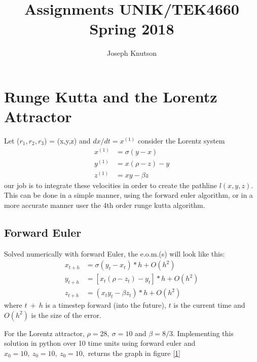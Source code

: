 \documentclass[a4paper,10pt]{article}
\title{Assignments UNIK/TEK4660 Spring 2018}
\author{Joseph Knutson}
\begin{document}
\maketitle

\section*{Runge Kutta and the Lorentz Attractor}

Let ($r_1,r_2,r_3$) = (x,y,z) and $dx/dt = x^{(1)}$ consider the Lorentz system
\begin{align}
 x^{(1)} &= \sigma(y - x) \label{x} \\ 
 y^{(1)} &= x(\rho - z) - y   \label{y}\\
 z^{(1)} &= xy - \beta z  \label{z}
\end{align}
our job is to integrate these velocities in order to create the pathline $l(x,y,z)$.
This can be done in a simple manner, using the forward euler algorithm, or in a more accurate manner user the 4th order runge kutta algorithm.

\subsection*{Forward Euler}

Solved numerically with forward Euler, the e.o.m.(s) will look like this:
\begin{align}
 x_{t+h} &= \sigma(y_{t} - x_{t})*h + O(h^2) \\
 y_{t+h} &= \left[x_{t}(\rho - z_{t}) - y_{t}\right]*h + O(h^2)\\
 z_{t+h} &= (x_{t}y_{t} - \beta z_{t})*h + O(h^2)
\end{align}
where $t\ +\ h$ is a timestep forward (into the future), $t$ is the current time and $O(h^2)$ is the size of the error.

For the Lorentz attractor, $\rho = 28,\ \sigma = 10$ and $\beta = 8/3$. 
Implementing this solution in python over 10 time units using forward euler and $x_0 = 10,\ z_0 = 10,\ z_0 = 10,$ returns the graph in figure \ref{1}
\end{document}
